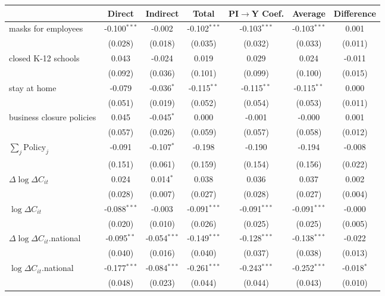 
\begin{tabular}{lccccc|>{}c}
\toprule
  & Direct & Indirect & Total & PI$\to$Y Coef. & Average & Difference\\
\midrule
masks for employees & -0.100$^{***}$ & -0.002 & -0.102$^{***}$ & -0.103$^{***}$ & -0.103$^{***}$ & 0.001\\
 & (0.028) & (0.018) & (0.035) & (0.032) & (0.033) & (0.011)\\
closed K-12 schools & 0.043 & -0.024 & 0.019 & 0.029 & 0.024 & -0.011\\
 & (0.092) & (0.036) & (0.101) & (0.099) & (0.100) & (0.015)\\
stay at home & -0.079 & -0.036$^{*}$ & -0.115$^{**}$ & -0.115$^{**}$ & -0.115$^{**}$ & 0.000\\
 & (0.051) & (0.019) & (0.052) & (0.054) & (0.053) & (0.011)\\
business closure policies & 0.045 & -0.045$^{*}$ & 0.000 & -0.001 & -0.000 & 0.001\\
 & (0.057) & (0.026) & (0.059) & (0.057) & (0.058) & (0.012)\\
$\sum_j \mathrm{Policy}_j$ & -0.091 & -0.107$^{*}$ & -0.198 & -0.190 & -0.194 & -0.008\\
 & (0.151) & (0.061) & (0.159) & (0.154) & (0.156) & (0.022)\\
$\Delta \log \Delta C_{it}$ & 0.024 & 0.014$^{*}$ & 0.038 & 0.036 & 0.037 & 0.002\\
 & (0.028) & (0.007) & (0.027) & (0.028) & (0.027) & (0.004)\\
$\log \Delta C_{it}$ & -0.088$^{***}$ & -0.003 & -0.091$^{***}$ & -0.091$^{***}$ & -0.091$^{***}$ & -0.000\\
 & (0.020) & (0.010) & (0.026) & (0.025) & (0.025) & (0.005)\\
$\Delta \log \Delta C_{it}$.national & -0.095$^{**}$ & -0.054$^{***}$ & -0.149$^{***}$ & -0.128$^{***}$ & -0.138$^{***}$ & -0.022\\
 & (0.040) & (0.016) & (0.040) & (0.037) & (0.038) & (0.013)\\
$\log \Delta C_{it}$.national & -0.177$^{***}$ & -0.084$^{***}$ & -0.261$^{***}$ & -0.243$^{***}$ & -0.252$^{***}$ & -0.018$^{*}$\\
 & (0.048) & (0.023) & (0.044) & (0.044) & (0.043) & (0.010)\\
\bottomrule
\end{tabular}